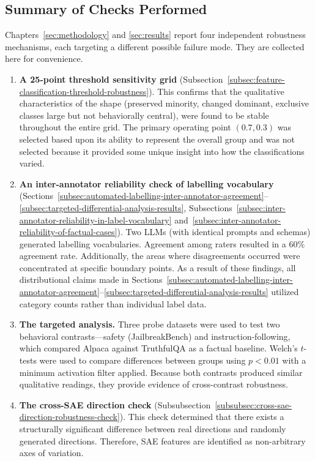 \subsection{Summary of Checks Performed}
\label{subsubsec:summary-of-checks-performed}

Chapters~\ref{sec:methodology} and \ref{sec:results} report four independent robustness mechanisms, each targeting a different possible failure mode. They are collected here for convenience.

\begin{enumerate}
    \item \textbf{A 25-point threshold sensitivity grid} (Subsection~\ref{subsec:feature-classification-threshold-robustness}). This confirms that the qualitative characteristics of the shape (preserved minority, changed dominant, exclusive classes large but not behaviorally central), were found to be stable throughout the entire grid. The primary operating point $(0.7, 0.3)$ was selected based upon its ability to represent the overall group and was not selected because it provided some unique insight into how the classifications varied.

    \item \textbf{An inter-annotator reliability check of labelling vocabulary} (Sections~\ref{subsec:automated-labelling-inter-annotator-agreement}--\ref{subsec:targeted-differential-analysis-results}, Subsections~\ref{subsec:inter-annotator-reliability-in-label-vocabulary} and~\ref{subsec:inter-annotator-reliability-of-factual-cases}). Two LLMs (with identical prompts and schemas) generated labelling vocabularies. Agreement among raters resulted in a 60\% agreement rate. Additionally, the areas where disagreements occurred were concentrated at specific boundary points. As a result of these findings, all distributional claims made in Sections~\ref{subsec:automated-labelling-inter-annotator-agreement}--\ref{subsec:targeted-differential-analysis-results} utilized category counts rather than individual label data.

    \item \textbf{The targeted analysis.} Three probe datasets were used to test two behavioral contrasts---safety (JailbreakBench) and instruction-following, which compared Alpaca \parencite{taori_stanford_alpaca_2023} against TruthfulQA as a factual baseline. Welch's $t$-tests were used to compare differences between groups using $p < 0.01$ with a minimum activation filter applied. Because both contrasts produced similar qualitative readings, they provide evidence of cross-contrast robustness.

    \item \textbf{The cross-SAE direction check} (Subsubsection~\ref{subsubsec:cross-sae-direction-robustness-check}). This check determined that there exists a structurally significant difference between real directions and randomly generated directions. Therefore, SAE features are identified as non-arbitrary axes of variation.
\end{enumerate}


